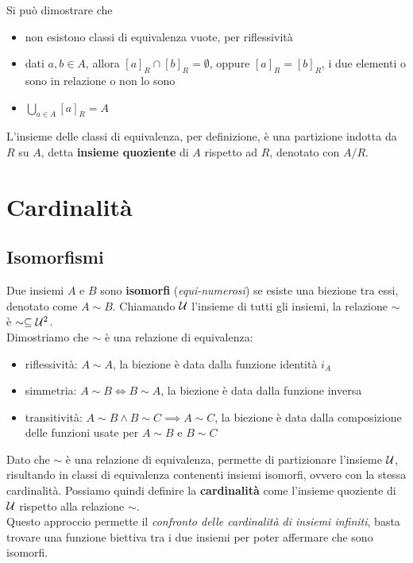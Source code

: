 Si può dimostrare che
\begin{itemize}
	\item non esistono classi di equivalenza vuote, per riflessività
	\item dati $a,b \in A$, allora $[a]_R \cap [b]_R = \emptyset$, oppure $[a]_R = [b]_R$, i due elementi o sono in relazione o non lo sono
	\item $\bigcup_{a \in A} [a]_R = A$
\end{itemize}

L'insieme delle classi di equivalenza, per definizione, è una partizione indotta da $R$ su $A$, detta \textbf{insieme quoziente} di $A$ rispetto ad $R$, denotato con $A / R$.\\

\section{Cardinalità}

\subsection{Isomorfismi}

Due insiemi $A$ e $B$ sono \textbf{isomorfi} (\textit{equi-numerosi}) se esiste una biezione tra essi, denotato come $A \sim B$. Chiamando $\mathcal{U}$ l'insieme di tutti gli insiemi, la relazione $\sim$ è $\sim \subseteq \mathcal{U}^2$.\\

Dimostriamo che $\sim$ è una relazione di equivalenza: 
\begin{itemize}
	\item riflessività: $A \sim A$, la biezione è data dalla funzione identità $i_A$
	\item simmetria: $A \sim B \Leftrightarrow B \sim A$, la biezione è data dalla funzione inversa
	\item transitività: $A \sim B \wedge B \sim C \implies A \sim C$, la biezione è data dalla composizione delle funzioni usate per $A \sim B$ e $B \sim C$
\end{itemize}

Dato che $\sim$ è una relazione di equivalenza, permette di partizionare l'insieme $\mathcal{U}$, risultando in classi di equivalenza contenenti insiemi isomorfi, ovvero con la stessa cardinalità. Possiamo quindi definire la \textbf{cardinalità} come l'insieme quoziente di $\mathcal{U}$ rispetto alla relazione $\sim$.\\

Questo approccio permette il \textit{confronto delle cardinalità di insiemi infiniti}, basta trovare una funzione biettiva tra i due insiemi per poter affermare che sono isomorfi.\\

